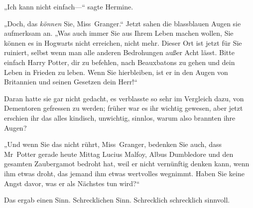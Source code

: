 „Ich kann nicht einfach—“ sagte Hermine.

„Doch, das \emph{können} Sie, Miss~Granger.“ Jetzt sahen die blassblauen Augen sie aufmerksam an. „Was auch immer Sie aus Ihrem Leben machen wollen, Sie können es in Hogwarts nicht erreichen, nicht mehr. Dieser Ort ist jetzt für Sie ruiniert, selbst wenn man alle anderen Bedrohungen außer Acht lässt. Bitte einfach Harry Potter, dir zu befehlen, nach Beauxbatons zu gehen und dein Leben in Frieden zu leben. Wenn Sie hierbleiben, ist er in den Augen von Britannien und seinen Gesetzen dein Herr!“

Daran hatte sie gar nicht gedacht, es verblasste so sehr im Vergleich dazu, von Dementoren gefressen zu werden; früher war es ihr wichtig gewesen, aber jetzt erschien ihr das alles kindisch, unwichtig, sinnlos, warum also brannten ihre Augen?

„Und wenn Sie das nicht rührt, Miss~Granger, bedenken Sie auch, dass Mr~Potter gerade heute Mittag Lucius Malfoy, Albus Dumbledore und den gesamten Zaubergamot bedroht hat, weil er nicht vernünftig denken kann, wenn ihm etwas droht, das jemand ihm etwas wertvolles wegnimmt. Haben Sie keine Angst davor, was er als Nächstes tun wird?“

Das ergab einen Sinn. Schrecklichen Sinn. Schrecklich schrecklich sinnvoll.

